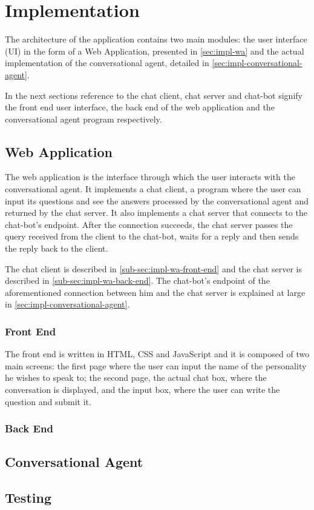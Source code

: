 \chapter{Implementation}
\label{chapter:implementation}

The architecture of the application contains two main modules: the user interface (UI) in the form of a Web Application, presented in \autoref{sec:impl-wa} and the actual implementation of the conversational agent, detailed in \autoref{sec:impl-conversational-agent}.

In the next sections reference to the chat client, chat server and chat-bot signify the front end user interface, the back end of the web application and the conversational agent program respectively.

\section{Web Application}
\label{sec:impl-wa}

The web application is the interface through which the user interacts with the conversational agent. It implements a chat client, a program where the user can input its questions and see the answers processed by the conversational agent and returned by the chat server. It also implements a chat server that connects to the chat-bot's endpoint. After the connection succeeds, the chat server passes the query received from the client to the chat-bot, waits for a reply and then sends the reply back to the client.

The chat client is described in \autoref{sub-sec:impl-wa-front-end} and the chat server is described in \autoref{sub-sec:impl-wa-back-end}. The chat-bot's endpoint of the aforementioned connection between him and the chat server is explained at large in \autoref{sec:impl-conversational-agent}.

\subsection{Front End}
\label{sub-sec:impl-wa-front-end}

The front end is written in HTML, CSS and JavaScript and it is composed of two main screens: the first page where the user can input the name of the personality he wishes to speak to; the second page, the actual chat box, where the conversation is displayed, and the input box, where the user can write the question and submit it.

\subsection{Back End}
\label{sub-sec:impl-wa-back-end}

\section{Conversational Agent}
\label{sec:impl-conversational-agent}

\section{Testing}
\label{sec:testing}
